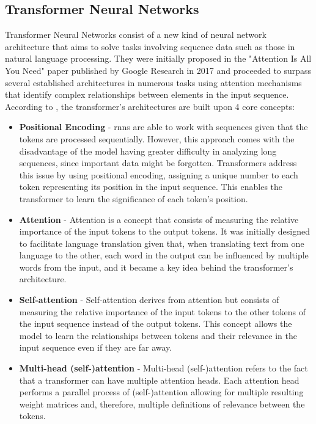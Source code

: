 \newpage

\subsection{Transformer Neural Networks}
\label{subsection:transformer_neural_networks}

Transformer Neural Networks consist of a new kind of neural network architecture that aims to solve tasks involving sequence data such as those in natural language processing. They were initially proposed in the "Attention Is All You Need" paper published by Google Research in 2017 \cite{Vaswani2017} and proceeded to surpass several established architectures in numerous tasks using attention mechanisms that identify complex relationships between elements in the input sequence. According to \textcite{Transformer_Oreilly}, the transformer's architectures are built upon 4 core concepts: %
\begin{itemize}
    \item \textbf{Positional Encoding} - \acs{rnn}s are able to work with sequences given that the tokens are processed sequentially. However, this approach comes with the disadvantage of the model having greater difficulty in analyzing long sequences, since important data might be forgotten. Transformers address this issue by using positional encoding, assigning a unique number to each token representing its position in the input sequence. This enables the transformer to learn the significance of each token's position.
    
    \item \textbf{Attention} - Attention is a concept that consists of measuring the relative importance of the input tokens to the output tokens. It was initially designed to facilitate language translation given that, when translating text from one language to the other, each word in the output can be influenced by multiple words from the input, and it became a key idea behind the transformer's architecture.

    \item \textbf{Self-attention} - Self-attention derives from attention but consists of measuring the relative importance of the input tokens to the other tokens of the input sequence instead of the output tokens. This concept allows the model to learn the relationships between tokens and their relevance in the input sequence even if they are far away.

    \item \textbf{Multi-head (self-)attention} - Multi-head (self-)attention refers to the fact that a transformer can have multiple attention heads. Each attention head performs a parallel process of (self-)attention allowing for multiple resulting weight matrices and, therefore, multiple definitions of relevance between the tokens.
\end{itemize}

